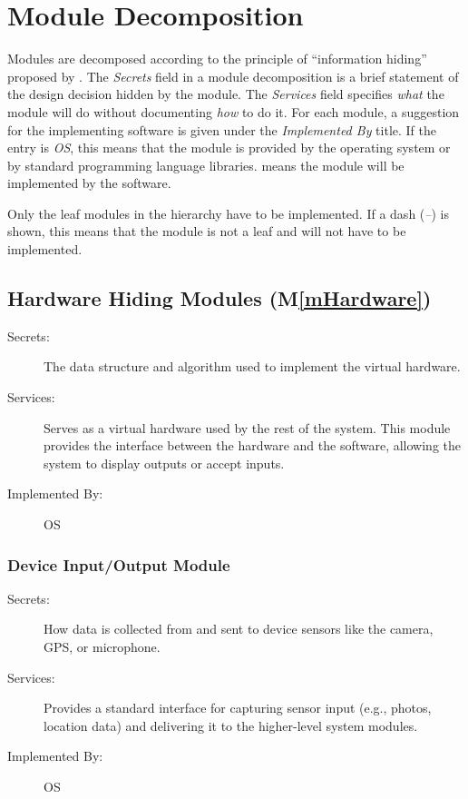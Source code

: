 \documentclass[12pt, titlepage]{article}
\newcommand{\mref}[1]{M\ref{#1}}
\begin{document}
\section{Module Decomposition} \label{SecMD}

Modules are decomposed according to the principle of ``information hiding''
proposed by \citet{ParnasEtAl1984}. The \emph{Secrets} field in a module
decomposition is a brief statement of the design decision hidden by the
module. The \emph{Services} field specifies \emph{what} the module will do
without documenting \emph{how} to do it. For each module, a suggestion for the
implementing software is given under the \emph{Implemented By} title. If the
entry is \emph{OS}, this means that the module is provided by the operating
system or by standard programming language libraries.  \emph{\progname{}} means the
module will be implemented by the \progname{} software.

Only the leaf modules in the hierarchy have to be implemented. If a dash
(\emph{--}) is shown, this means that the module is not a leaf and will not have
to be implemented.

\subsection{Hardware Hiding Modules (\mref{mHardware})}

\begin{description}
\item[Secrets:] The data structure and algorithm used to implement the virtual hardware.
\item[Services:] Serves as a virtual hardware used by the rest of the system. This module provides the interface between the hardware and the software, allowing the system to display outputs or accept inputs.
\item[Implemented By:] OS
\end{description}

\subsubsection{Device Input/Output Module}

\begin{description}
\item[Secrets:] How data is collected from and sent to device sensors like the camera, GPS, or microphone.
\item[Services:] Provides a standard interface for capturing sensor input (e.g., photos, location data) and delivering it to the higher-level system modules.
\item[Implemented By:] OS
\end{description}
\end{document}
